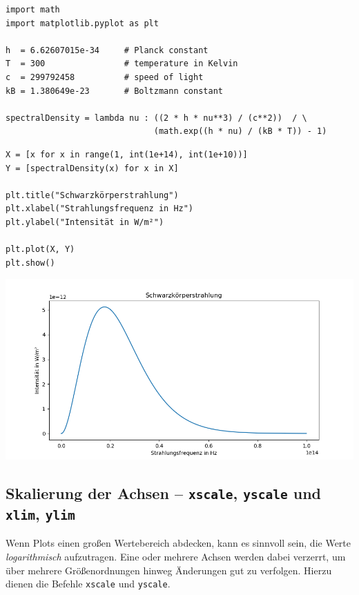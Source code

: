 \begin{codebox}
\begin{verbatim}
import math
import matplotlib.pyplot as plt

h  = 6.62607015e-34     # Planck constant
T  = 300                # temperature in Kelvin
c  = 299792458          # speed of light
kB = 1.380649e-23       # Boltzmann constant

spectralDensity = lambda nu : ((2 * h * nu**3) / (c**2))  / \
                              (math.exp((h * nu) / (kB * T)) - 1)
\end{verbatim}
\end{codebox}
%
\begin{codebox}[]
\begin{verbatim}
X = [x for x in range(1, int(1e+14), int(1e+10))]
Y = [spectralDensity(x) for x in X]

plt.title("Schwarzkörperstrahlung")
plt.xlabel("Strahlungsfrequenz in Hz")
plt.ylabel("Intensität in W/m²")

plt.plot(X, Y)
plt.show()
\end{verbatim}
\end{codebox}
%
\begin{tcolorbox}[title=Ausgabe: Plot mit Titel und Labels]
	\includegraphics[width=\linewidth]{./gfx/plt-labels}
\end{tcolorbox}

\subsection{Skalierung der Achsen -- \texttt{xscale}, \texttt{yscale} und \texttt{xlim}, \texttt{ylim}}
Wenn Plots einen großen Wertebereich abdecken, kann es sinnvoll sein, die Werte \emph{logarithmisch} aufzutragen. Eine oder mehrere Achsen werden dabei verzerrt, um über mehrere Größenordnungen hinweg Änderungen gut zu verfolgen. Hierzu dienen die Befehle \texttt{xscale} und \texttt{yscale}.

